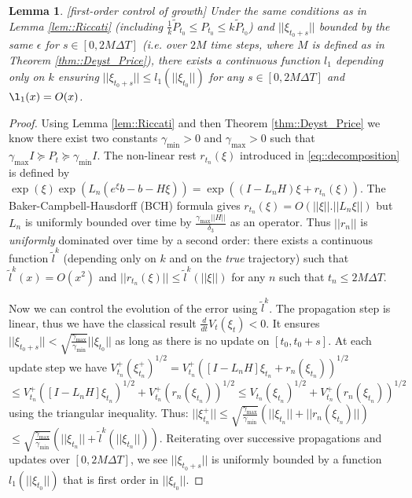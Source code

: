 \documentclass[a4paper,12pt,onecolumn]{article}
\newtheorem{lem}{Lemma}
\begin{document}
\begin{lem}\emph{[first-order control of growth]}
Under the same conditions as in Lemma \ref{lem::Riccati} (including $\frac{1}{k} \tilde{P}_{t_0} \leq P_{t_0} \leq k \tilde{P}_{t_0}$) and $||\xi_{t_0+s}||$ bounded by the same $\epsilon$ for $s \in [0,2M \Delta T]$ (i.e. over $2M$ time steps, where $M$ is defined as in Theorem \ref{thm::Deyst_Price}), there exists a continuous function $l_1$ depending \emph{only} on $k$ ensuring $ || \xi_{t_0+s} || \leq l_1( || \xi_{t_0} ||)$ for any $s \in [0,2M \Delta T] $ and $\l_1 (x) = O ( x)$.
\label{lem::first_order}
\end{lem}
\begin{proof}
Using Lemma \ref{lem::Riccati} and then Theorem \ref{thm::Deyst_Price} we know there exist two constants $\gamma_{\min}>0$ and $\gamma_{\max}>0$ such that $\gamma_{\max} I \succeq P_t \succeq \gamma_{\min} I$. The non-linear rest $r_{t_n}(\xi)$ introduced in \eqref{eq::decomposition} is defined by $\exp(\xi)\exp(L_n(e^\xi b - b - H \xi ))=\exp((I-L_n H)\xi+r_{t_n}(\xi))$. The Baker-Campbell-Hausdorff (BCH) formula gives $r_{t_n}(\xi)=O(||\xi||.||L_n \xi||)$ but $L_n$ is uniformly bounded over time by $\frac{\gamma_{\max} ||H||}{\delta_3}$ as an operator. Thus $||r_n||$ is \emph{uniformly} dominated over time by a second order: there exists a continuous function $\tilde{l}^k$ (depending only on $k$ and on the \emph{true} trajectory) such that $\tilde{l}^k(x) = O(x^2)$ and $||r_{t_n} (\xi)|| \leq \tilde{l}^k (|| \xi ||)$ for any $n$ such that $t_n\leq 2M\Delta T$.

Now we can control the evolution of the error using $\tilde{l}^k$. The propagation step is linear, thus we have the classical result $\frac{d}{dt} V_t(\xi_t) <0$. It ensures $||\xi_{t_0+s}|| < \sqrt{ \frac{\gamma_{\max}}{\gamma_{\min}} } ||\xi_{t_0}||$ as long as there is no update on $[t_0,t_0+s]$. At each update step we have $V_{t_n}^+(\xi_{t_n}^+)^{1/2} = V_{t_n}^+ \left( [I-L_n H] \xi_{t_n} + r_n \left( \xi_{t_n} \right) \right)^{1/2} $ $ \leq V_{t_n}^+ \left( [I-L_n H] \xi_{t_n} \right)^{1/2} + V_{t_n}^+ \left( r_n(\xi_{t_n}) \right)^{1/2} \leq V_{t_n}\left(\xi_{t_n} \right)^{1/2} + V_{t_n}^+ \left( r_n(\xi_{t_n} ) \right)^{1/2}$ using the triangular inequality. Thus: $||\xi_{t_n}^+|| \leq \sqrt{ \frac{\gamma_{\max}}{\gamma_{\min}} } \left( || \xi_{t_n} || + ||r_n (\xi_{t_n}) || \right) $~~$\leq \sqrt{ \frac{\gamma_{\max}}{\gamma_{\min}} } \left( || \xi_{t_n} || +\tilde{l}^k( || \xi_{t_n} ||) \right)$. Reiterating over successive propagations and updates  over $[0, 2 M \Delta T]$,  we see  $||\xi_{t_0+s}||$ is uniformly bounded by a  function $l_1(||\xi_{t_0}||)$ that is first order in $||\xi_{t_0}||$.

\end{proof}
\end{document}
